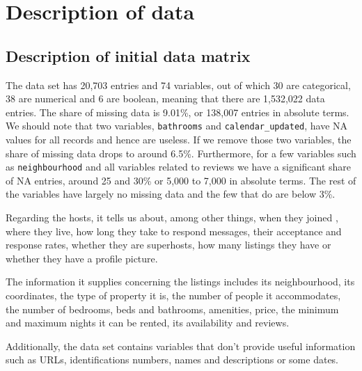 


\section{Description of data}%
\label{sec:description_of_data}

\subsection{Description of initial data matrix}

The data set has 20,703 entries and 74 variables, out of which 30 are categorical,
38 are numerical and 6 are boolean, meaning that there are 1,532,022 data entries.
The share of missing data is 9.01\%, or 138,007
entries in absolute terms. We should note that two variables, \texttt{bathrooms} and
\texttt{calendar\_updated}, have NA values for all records and hence are useless. 
If we remove those two variables, the share of missing data drops to 
around 6.5\%.
Furthermore, for a few variables such as \texttt{neighbourhood} and all variables
related to reviews we have a significant share of NA entries, around 25 and 30\%
or 5,000 to 7,000 in absolute terms. The rest of the variables have largely no 
missing data and the few that do are below 3\%.

Regarding the hosts, it tells us about, among other things, when they joined
\airbnb, where they live, how long they take to respond 
messages, their acceptance and response rates, whether they are superhosts, how 
many listings they have or whether they have a profile picture.

The information it supplies concerning the listings includes its
neighbourhood, its coordinates, the type of property it is, the number of people 
it accommodates, the number of bedrooms, beds and bathrooms, amenities, price, 
the minimum and maximum nights it can be rented, its availability and reviews.

Additionally, the data set contains variables that don't provide useful information 
such as URLs, identifications numbers, names and descriptions or some dates.







